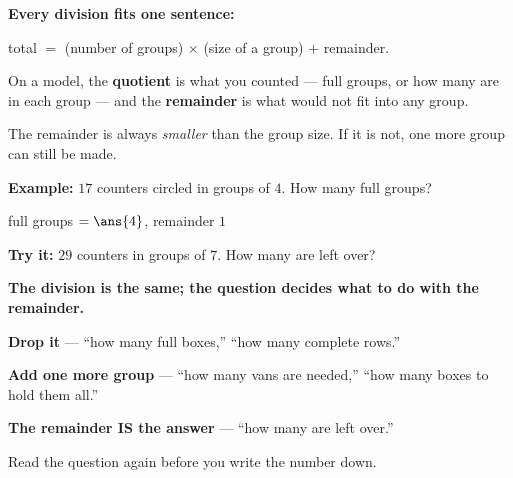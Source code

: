 \documentclass[12pt]{article}
\begin{document}


\begin{formulabox}
\textbf{Every division fits one sentence:}\par
total $=$ (number of groups) $\times$ (size of a group) $+$ remainder.\par
On a model, the \textbf{quotient} is what you counted --- full groups, or how many are in each group ---
and the \textbf{remainder} is what would not fit into any group.\par
The remainder is always \emph{smaller} than the group size. If it is not, one more group can still be
made.
\end{formulabox}

\begin{examplebox}
\textbf{Example:} \quad $17$ counters circled in groups of $4$. How many full groups?
\par\vspace{2pt}
\begin{center}
\end{center}

full groups $= \ans{4}$, remainder $1$
\end{examplebox}

\begin{tryitbox}
\textbf{Try it:} \quad $29$ counters in groups of $7$. How many are left over?\\[2pt]
\end{tryitbox}


\begin{formulabox}
\textbf{The division is the same; the question decides what to do with the remainder.}\par
\textbf{Drop it} --- ``how many full boxes,'' ``how many complete rows.''\par
\textbf{Add one more group} --- ``how many vans are needed,'' ``how many boxes to hold them all.''\par
\textbf{The remainder IS the answer} --- ``how many are left over.''\par
Read the question again before you write the number down.
\end{formulabox}
\end{document}
